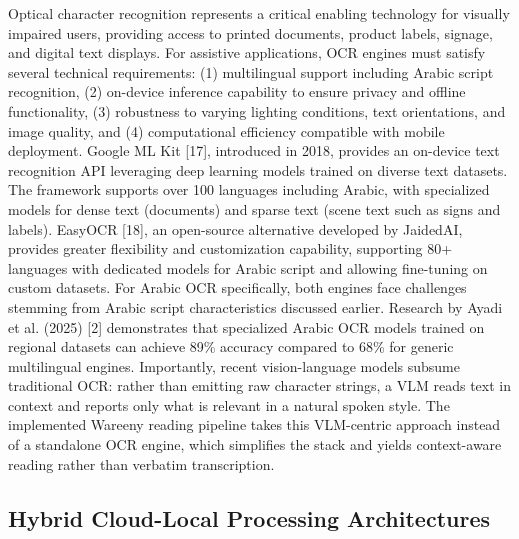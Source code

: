 \documentclass[a4paper]{report}
\begin{document}
Optical character recognition represents a critical enabling technology for visually impaired users, providing access to printed documents, product labels, signage, and digital text displays. For assistive applications, OCR engines must satisfy several technical requirements: (1) multilingual support including Arabic script recognition, (2) on-device inference capability to ensure privacy and offline functionality, (3) robustness to varying lighting conditions, text orientations, and image quality, and (4) computational efficiency compatible with mobile deployment. Google ML Kit [17], introduced in 2018, provides an on-device text recognition API leveraging deep learning models trained on diverse text datasets. The framework supports over 100 languages including Arabic, with specialized models for dense text (documents) and sparse text (scene text such as signs and labels). EasyOCR [18], an open-source alternative developed by JaidedAI, provides greater flexibility and customization capability, supporting 80+ languages with dedicated models for Arabic script and allowing fine-tuning on custom datasets. For Arabic OCR specifically, both engines face challenges stemming from Arabic script characteristics discussed earlier. Research by Ayadi et al. (2025) [2] demonstrates that specialized Arabic OCR models trained on regional datasets can achieve 89\% accuracy compared to 68\% for generic multilingual engines. Importantly, recent vision-language models subsume traditional OCR: rather than emitting raw character strings, a VLM reads text in context and reports only what is relevant in a natural spoken style. The implemented Wareeny reading pipeline takes this VLM-centric approach instead of a standalone OCR engine, which simplifies the stack and yields context-aware reading rather than verbatim transcription.

\subsection{Hybrid Cloud-Local Processing Architectures}
\end{document}
